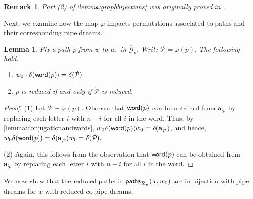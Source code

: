 \documentclass[12 pt]{amsart}
\newcommand{\paths}{{\sf paths}}
\newcommand{\word}{{\sf word}}
\newtheorem{remark}[Theorem]{Remark}
\newtheorem{lemma}[Theorem]{Lemma}
\numberwithin{equation}{section}
\theoremstyle{remark}
\newcommand{\demprod}{\delta}
\begin{document}
	\begin{remark}
		Part (2) of \cref{lemma:graphbijections} was originally proved in  \cite[Lemma~10]{Lenart.Sottile}.
	\end{remark}
	

	
	Next, we examine how the map $\varphi$ impacts permutations associated to paths and their corresponding pipe dreams.
	
		\begin{lemma}
			\label{lemma:pathwords}
			Fix a path $p$ from $w$ to $w_0$ in $\overline{\mathcal{G}}_n$. Write $\mathcal{P} = \varphi(p)$. The following hold.
		\begin{enumerate}
		\item $w_0\cdot \demprod(\word(p)) = \demprod(\check{\mathcal{P}})$.
		\item $p$ is reduced if and only if $\check{\mathcal{P}}$ is reduced.
		\end{enumerate}
		\end{lemma}
		
		\begin{proof}
		\noindent (1) Let $\mathcal{P} = \varphi(p)$. Observe that $\word(p)$ can be obtained from $\mathbf{a}_{\check{\mathcal{P}}}$ by replacing each letter $i$ with $n - i$ for all $i$ in the word.
			Thus, by \cref{lemma:conjugationandwords}, $w_0\demprod(\word(p))w_0 = \demprod(\mathbf{a}_{\check{\mathcal{P}}})$,
			and hence,
			$w_0\demprod(\word(p)) = \demprod(\mathbf{a}_{\check{\mathcal{P}}})w_0 = \demprod(\check{\mathcal{P}}).$
			
		\noindent (2) Again, this follows from the observation that $\word(p)$ can be obtained from $\mathbf{a}_{\check{\mathcal{P}}}$ by replacing each letter $i$ with $n - i$ for all $i$ in the word.
		\end{proof}
		
		We now show that the reduced paths in $\paths_{\mathcal{R}_n}(w,w_0)$ are in bijection with pipe dreams for $w$ with reduced co-pipe dreams.
		
\end{document}
